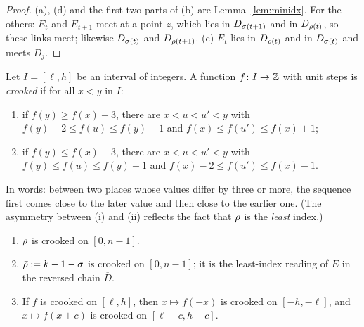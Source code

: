 \begin{proof}
(a), (d) and the first two parts of (b) are Lemma~\ref{lem:minidx}. For the others: $E_t$ and $E_{t+1}$ meet at a point
$z$, which lies in $D_{\sigma(t+1)}$ and in $D_{\rho(t)}$, so these links meet; likewise $D_{\sigma(t)}$ and $D_{\rho(t+1)}$. (c)
$E_t$ lies in $D_{\rho(t)}$ and in $D_{\sigma(t)}$ and meets $D_j$.
\end{proof}


\begin{definition}\label{def:crooked-seq}
Let $I=[\ell,h]$ be an interval of integers. A function $f\colon I\to\mathbb{Z}$ with unit steps is \emph{crooked} if for all
$x<y$ in $I$:
\begin{enumerate}[label=(\roman*)]
\item if $f(y)\ge f(x)+3$, there are $x<u<u'<y$ with $f(y)-2\le f(u)\le f(y)-1$ and $f(x)\le f(u')\le f(x)+1$;
\item if $f(y)\le f(x)-3$, there are $x<u<u'<y$ with $f(y)\le f(u)\le f(y)+1$ and $f(x)-2\le f(u')\le f(x)-1$.
\end{enumerate}
\end{definition}

In words: between two places whose values differ by three or more, the sequence first comes close to the later value
and then close to the earlier one. (The asymmetry between (i) and (ii) reflects the fact that $\rho$ is the
\emph{least} index.)


\begin{lemma}\label{lem:crooked-seq}
\begin{enumerate}[label=(\alph*)]
\item $\rho$ is crooked on $[0,n-1]$.
\item $\bar{\rho}:=k-1-\sigma$ is crooked on $[0,n-1]$; it is the least-index reading of $E$ in the reversed chain $\overline D$.
\item If $f$ is crooked on $[\ell,h]$, then $x\mapsto f(-x)$ is crooked on $[-h,-\ell]$, and $x\mapsto f(x+c)$ is crooked on
$[\ell-c,h-c]$.
\end{enumerate}
\end{lemma}

